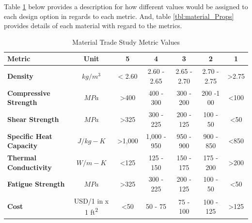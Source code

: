 Table \ref{tbl:material_Metric_Scores} below provides a description for how different values would be assigned to each design option in regards to each metric. And, table \ref{tbl:material_Props} provides details of each material with regard to the metrics.

\begin{table}[H]
\centering
\begin{tabular}{|l|c|c|c|c|c|c|} 
\hline
    \textbf{Metric} & \textbf{Unit} & \textbf{5} & \textbf{4} & \textbf{3} & \textbf{2} & \textbf{1}
    \\
\hline
    \textbf{Density} & $kg/{m^3}$ & < 2.60 & 2.60 - 2.65 & 2.65 - 2.70 & 2.70 - 2.75 & >2.75
    \\
\hline
    \textbf{Compressive Strength} & $MPa$ & >400 & 400 - 300 & 300 - 200 & 200 -1 00 & <100 
    \\
\hline
    \textbf{Shear Strength} & $MPa$ & >325 & 300 - 225 & 200 - 125 & 100 - 50 & <50
    \\
\hline
    \textbf{Specific Heat Capacity} & $J/{kg-K}$ & >1,000 & 1,000 - 950 & 950 - 900 & 900 - 850 & <850 
    \\
\hline
    \textbf{Thermal Conductivity} & $W/{m-K}$ & <125 & 125 - 150 & 150 - 175 & 175 - 200 & >200 
    \\
\hline
    \textbf{Fatigue Strength} & $MPa$ & >325 & 300 - 225 & 200 - 125 & 100 - 50 & <50
    \\
\hline
    \textbf{Cost} & USD/1 in x 1 ft\textsuperscript{2} & <50 & 50 - 75 & 75 - 100 & 100 - 125 & >125
    \\

\hline
\end{tabular}
\caption{Material Trade Study Metric Values}
\label{tbl:material_Metric_Scores}
\end{table}

